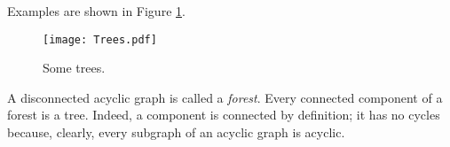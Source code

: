 Examples are shown in Figure \ref{fig:Trees}.

\begin{figure}[ht]
\begin{center}
\texttt{[image: Trees.pdf]}
\end{center}
\caption{Some trees.}
\label{fig:Trees}
\end{figure}

A disconnected acyclic graph is called a \emph{forest}.
Every connected component of a forest is a tree.
Indeed, a component is connected by definition; it has no cycles because, clearly, every subgraph of an acyclic graph is acyclic.
